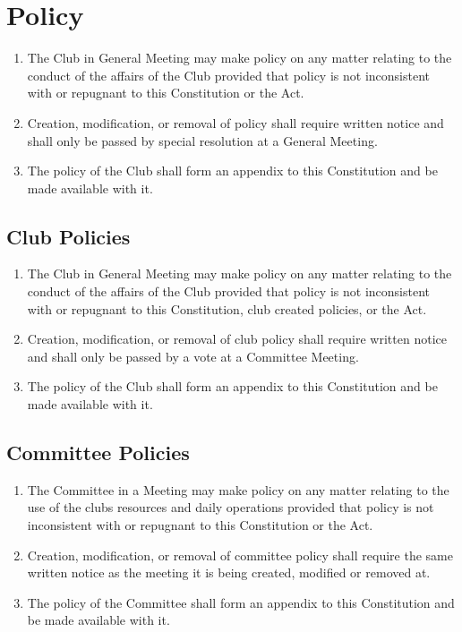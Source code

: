 \documentclass[11pt]{article} %
\begin{document}
\section{Policy}

{\color{red}\begin{enumerate}
	\item The Club in General Meeting may make policy on any matter relating to the conduct of the affairs of the Club provided that policy is not inconsistent with or repugnant to this Constitution or the Act.
	\item Creation, modification, or removal of policy shall require written notice and shall only be passed by special resolution at a General Meeting.
	\item The policy of the Club shall form an appendix to this Constitution and be made available with it.
\end{enumerate}}

{\color{ForestGreen}\subsection{Club Policies}
\begin{enumerate}
	\item The Club in General Meeting may make policy on any matter relating to the conduct of the affairs of the Club provided that policy is not inconsistent with or repugnant to this Constitution, club created policies, or the Act.
	\item Creation, modification, or removal of club policy shall require written notice and shall only be passed by a vote at a Committee Meeting.
	\item The policy of the Club shall form an appendix to this Constitution and be made available with it.
\end{enumerate}}

{\color{ForestGreen}
\subsection{Committee Policies}
\begin{enumerate}
	\item The Committee in a Meeting may make policy on any matter relating to the use of the clubs resources and daily operations provided that policy is not inconsistent with or repugnant to this Constitution or the Act.
	\item Creation, modification, or removal of committee policy shall require the same written notice as the meeting it is being created, modified or removed at.
	\item The policy of the Committee shall form an appendix to this Constitution and be made available with it.
\end{enumerate}}
\end{document}
